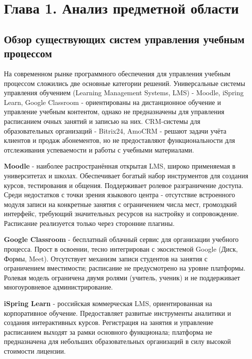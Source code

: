 \section*{Глава 1. Анализ предметной области}

\subsection{Обзор существующих систем управления учебным процессом}

На современном рынке программного обеспечения для управления учебным процессом
сложились две основные категории решений. Универсальные системы управления
обучением (Learning Management Systems, LMS) - Moodle, iSpring Learn, Google
Classroom - ориентированы на дистанционное обучение и управление учебным контентом,
однако не предназначены для управления расписанием очных занятий и записью
на них. CRM-системы для образовательных организаций - Bitrix24, AmoCRM -
решают задачи учёта клиентов и продаж абонементов, но не предоставляют
функциональности для отслеживания успеваемости и работы с учебными материалами.

\textbf{Moodle} - наиболее распространённая открытая LMS, широко применяемая
в университетах и школах. Обеспечивает богатый набор инструментов для создания
курсов, тестирования и общения. Поддерживает ролевое разграничение доступа.
Среди недостатков с точки зрения языкового центра - отсутствие встроенного
модуля записи на конкретные занятия с ограничением числа мест, громоздкий
интерфейс, требующий значительных ресурсов на настройку и сопровождение.
Расписание реализуется только через сторонние плагины.

\textbf{Google Classroom} - бесплатный облачный сервис для организации учебного
процесса. Прост в освоении, тесно интегрирован с экосистемой Google (Диск,
Формы, Meet). Отсутствует механизм записи студентов на занятия с ограничением
вместимости; расписание не предусмотрено на уровне платформы. Ролевая модель
ограничена двумя ролями (учитель, ученик) и не поддерживает многоуровневое
администрирование.

\textbf{iSpring Learn} - российская коммерческая LMS, ориентированная на
корпоративное обучение. Предоставляет развитые инструменты аналитики и создания
интерактивных курсов. Регистрация на занятия и управление расписанием выходят
за рамки основного функционала; платформа не предназначена для небольших
образовательных организаций в силу высокой стоимости лицензии.

